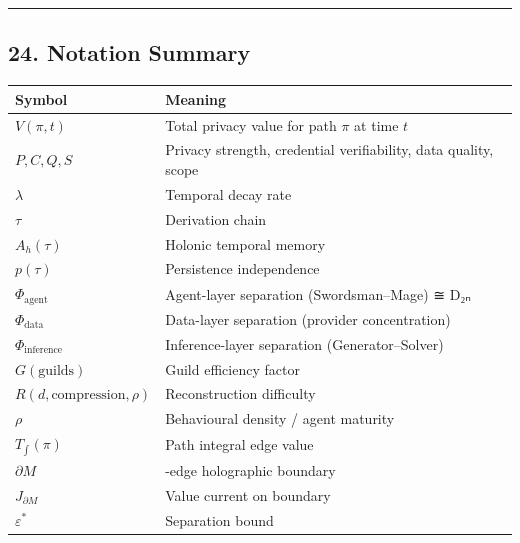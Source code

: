\documentclass[
  11pt,
]{article}
\newcounter{none} %
\begin{document}
\begin{center}\rule{0.5\linewidth}{0.5pt}\end{center}

\subsection{24. Notation Summary}\label{notation-summary}

{\def\LTcaptype{none} %
\begin{longtable}[]{@{}
  >{\raggedright\arraybackslash}p{}
  >{\raggedright\arraybackslash}p{}@{}}
\toprule\noalign{}
\begin{minipage}[b]{\linewidth}\raggedright
Symbol
\end{minipage} & \begin{minipage}[b]{\linewidth}\raggedright
Meaning
\end{minipage} \\
\midrule\noalign{}
\endhead
\bottomrule\noalign{}
\endlastfoot
\(V(\pi, t)\) & Total privacy value for path \(\pi\) at time \(t\) \\
\(P, C, Q, S\) & Privacy strength, credential verifiability, data
quality, scope \\
\(\lambda\) & Temporal decay rate \\
\(\tau\) & Derivation chain \\
\(A_h(\tau)\) & Holonic temporal memory \\
\(p(\tau)\) & Persistence independence \\
\(\Phi_{\text{agent}}\) & Agent-layer separation (Swordsman--Mage) ≅
D₂ₙ \\
\(\Phi_{\text{data}}\) & Data-layer separation (provider
concentration) \\
\(\Phi_{\text{inference}}\) & Inference-layer separation
(Generator--Solver) \\
\(G(\text{guilds})\) & Guild efficiency factor \\
\(R(d, \text{compression}, \rho)\) & Reconstruction difficulty \\
\(\rho\) & Behavioural density / agent maturity \\
\(T_{\int}(\pi)\) & Path integral edge value \\
\(\partial M\) & 96-edge holographic boundary \\
\(J_{\partial M}\) & Value current on boundary \\
\(\varepsilon^*\) & Separation bound \\

\end{longtable}}
\end{document}
